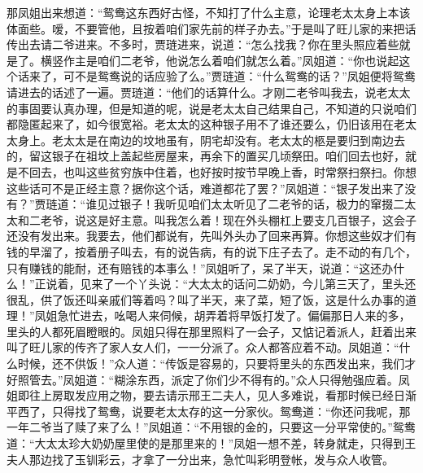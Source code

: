 \begin{parag}
    那凤姐出来想道：“鸳鸯这东西好古怪，不知打了什么主意，论理老太太身上本该体面些。嗳，不要管他，且按着咱们家先前的样子办去。”于是叫了旺儿家的来把话传出去请二爷进来。不多时，贾琏进来，说道：“怎么找我？你在里头照应着些就是了。横竖作主是咱们二老爷，他说怎么着咱们就怎么着。”凤姐道：“你也说起这个话来了，可不是鸳鸯说的话应验了么。”贾琏道：“什么鸳鸯的话？”凤姐便将鸳鸯请进去的话述了一遍。贾琏道：“他们的话算什么。才刚二老爷叫我去，说老太太的事固要认真办理，但是知道的呢，说是老太太自己结果自己，不知道的只说咱们都隐匿起来了，如今很宽裕。老太太的这种银子用不了谁还要么，仍旧该用在老太太身上。老太太是在南边的坟地虽有，阴宅却没有。老太太的柩是要归到南边去的，留这银子在祖坟上盖起些房屋来，再余下的置买几顷祭田。咱们回去也好，就是不回去，也叫这些贫穷族中住着，也好按时按节早晚上香，时常祭扫祭扫。你想这些话可不是正经主意？据你这个话，难道都花了罢？”凤姐道：“银子发出来了没有？”贾琏道：“谁见过银子！我听见咱们太太听见了二老爷的话，极力的窜掇二太太和二老爷，说这是好主意。叫我怎么着！现在外头棚杠上要支几百银子，这会子还没有发出来。我要去，他们都说有，先叫外头办了回来再算。你想这些奴才们有钱的早溜了，按着册子叫去，有的说告病，有的说下庄子去了。走不动的有几个，只有赚钱的能耐，还有赔钱的本事么！”凤姐听了，呆了半天，说道：“这还办什么！”正说着，见来了一个丫头说：“大太太的话问二奶奶，今儿第三天了，里头还很乱，供了饭还叫亲戚们等着吗？叫了半天，来了菜，短了饭，这是什么办事的道理！”凤姐急忙进去，吆喝人来伺候，胡弄着将早饭打发了。偏偏那日人来的多，里头的人都死眉瞪眼的。凤姐只得在那里照料了一会子，又惦记着派人，赶着出来叫了旺儿家的传齐了家人女人们，一一分派了。众人都答应着不动。凤姐道：“什么时候，还不供饭！”众人道：“传饭是容易的，只要将里头的东西发出来，我们才好照管去。”凤姐道：“糊涂东西，派定了你们少不得有的。”众人只得勉强应着。凤姐即往上房取发应用之物，要去请示邢王二夫人，见人多难说，看那时候已经日渐平西了，只得找了鸳鸯，说要老太太存的这一分家伙。鸳鸯道：“你还问我呢，那一年二爷当了赎了来了么！”凤姐道：“不用银的金的，只要这一分平常使的。”鸳鸯道：“大太太珍大奶奶屋里使的是那里来的！”凤姐一想不差，转身就走，只得到王夫人那边找了玉钏彩云，才拿了一分出来，急忙叫彩明登帐，发与众人收管。
\end{parag}


